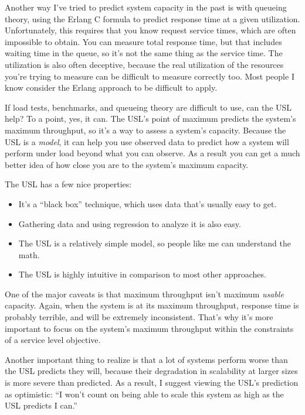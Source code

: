 \documentclass{vivid_layout}
\begin{document}
Another way I've tried to predict system capacity in the past is with queueing
theory, using the Erlang C formula to predict response time at a given
utilization.  Unfortunately, this requires that you know request service times,
which are often impossible to obtain. You can measure total response time, but
that includes waiting time in the queue, so it's not the same thing as the
service time. The utilization is also often deceptive, because the real
utilization of the resources you're trying to measure can be difficult to
measure correctly too. Most people I know consider the Erlang approach to be
difficult to apply.

If load tests, benchmarks, and queueing theory are difficult to use, can the USL
help? To a point, yes, it can.  The USL's point of maximum predicts the system's
maximum throughput, so it's a way to assess a system's capacity.  Because the
USL is a {\itshape model}, it can help you use observed data to predict how a
system will perform under load beyond what you can observe. As a result you can
get a much better idea of how close you are to the system's maximum capacity.

The USL has a few nice properties:

\begin{itemize}
\item It's a ``black box'' technique, which uses data that's usually easy to get.
\item Gathering data and using regression to analyze it is also easy.
\item The USL is a relatively simple model, so people like me can understand the math. 
\item The USL is highly intuitive in comparison to most other approaches.
\end{itemize}

One of the major caveats is that maximum throughput isn't maximum {\itshape
usable} capacity. Again, when the system is at its maximum throughput, response
time is probably terrible, and will be extremely inconsistent. That's why it's
more important to focus on the system's maximum throughput within the
constraints of a service level objective.

Another important thing to realize is that a lot of systems perform worse than
the USL predicts they will, because their degradation in scalability at larger
sizes is more severe than predicted. As a result, I suggest viewing the USL's
prediction as optimistic: ``I won't count on being able to scale this system as
high as the USL predicts I can.''
\end{document}
